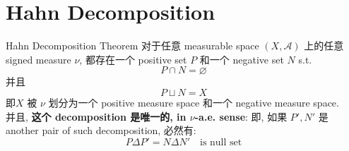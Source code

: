 \documentclass[lang=cn,11pt]{elegantbook}
\begin{document}
\section{Hahn Decomposition}
\begin{theorem}{Hahn Decomposition Theorem}
对于任意 measurable space $(X,\mathcal{A})$ 上的任意 signed measure $\nu$, 都存在一个 positive set $P$ 和一个 negative set $N$ s.t. \[
P \cap N = \varnothing
\]
并且 \[
P \sqcup N = X
\]
即$X$ 被 $\nu$ 划分为一个 positive measure space 和一个 negative measure space. \\
并且, \textbf{这个 decomposition 是唯一的, in $\nu$-a.e. sense}: 即, 如果 $P',N'$ 是 another pair of such decomposition, 必然有: \[
P \Delta P' =  N \Delta N' \quad \text{is null set}
\]
\end{theorem}
\end{document}
